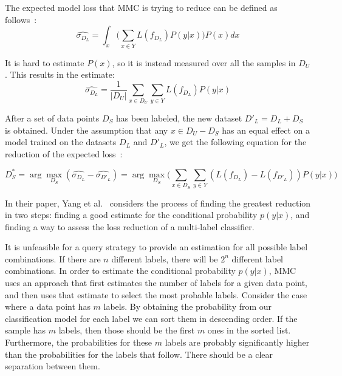 The expected model loss that MMC is trying to reduce can be defined as follows~\cite{yang2009effective}:
\begin{equation}
    \widehat{\sigma_{D_L}} = \int_x \bigg ( \sum_{x \in Y} L(f_{D_L})P(y|x) \bigg ) P(x)dx
\end{equation}

It is hard to estimate $P(x)$, so it is instead measured over all the samples in $D_U$.
This results in the estimate:
\begin{equation}
    \widehat{\sigma_{D_L}} = \frac{1}{|D_U|} \sum_{x \in D_U} \sum_{y \in Y} L(f_{D_L})P(y|x)
\end{equation}

After a set of data points $D_S$ has been labeled, the new dataset $D'_L=D_L + D_S$ is obtained.
Under the assumption that any $x \in D_U - D_S$ has an equal effect on a model trained on the datasets $D_L$ and $D'_L$, we get the following equation for the reduction of the expected loss~\cite{yang2009effective}:

\begin{equation}
    D^*_S = \arg\max_{D_S}(\widehat{\sigma_{D_L}} - \widehat{\sigma_{D'_L}}) = \arg\max_{D_S} \big ( \sum_{x \in D_S} \sum_{y \in Y} (L(f_{D_L}) - L(f_{D'_L})) P(y|x) \big )
\end{equation}

In their paper, Yang et al\@.~\cite{yang2009effective} considers the process of finding the greatest reduction in two steps: finding a good estimate for the conditional probability $p(y|x)$, and finding a way to assess the loss reduction of a multi-label classifier.

It is unfeasible for a query strategy to provide an estimation for all possible label combinations.
If there are $n$ different labels, there will be $2^n$ different label combinations.
In order to estimate the conditional probability $p(y|x)$, MMC uses an approach that first estimates the number of labels for a given data point, and then uses that estimate to select the most probable labels.
Consider the case where a data point has $m$ labels.
By obtaining the probability from our classification model for each label we can sort them in descending order.
If the sample has $m$ labels, then those should be the first $m$ ones in the sorted list.
Furthermore, the probabilities for these $m$ labels are probably significantly higher than the probabilities for the labels that follow.
There should be a clear separation between them.

